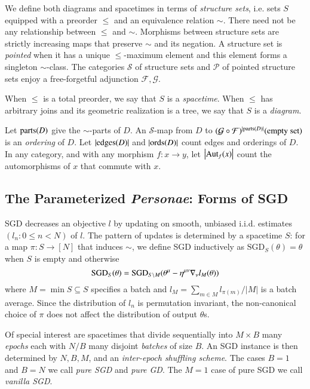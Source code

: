 \documentclass{article}
\theoremstyle{plain}
\theoremstyle{definition}
\newcommand{\wabs}[1]{\left|#1\right|}
\newcommand{\Free}{\mathcal{F}}
\newcommand{\Forg}{\mathcal{G}}
\newcommand{\Aut}{\text{\textnormal{Aut}}}
\newcommand{\edges}{\text{\textnormal{edges}}}
\newcommand{\ords}{\text{\textnormal{ords}}}
\newcommand{\parts}{\text{\textnormal{parts}}}
\newcommand{\SGD}{\text{\textnormal{SGD}}}
\newcommand{\Pp}{\mathcal{P}}
\newcommand{\Ss}{\mathcal{S}}
\begin{document}
        We define both diagrams and spacetimes in terms of \emph{structure
        sets}, i.e. sets $S$ equipped with a preorder $\leq$ and an equivalence
        relation $\sim$.  There need not be any relationship between $\leq$ and
        $\sim$.  Morphisms between structure sets are strictly increasing maps
        that preserve $\sim$ and its negation.  A structure set is
        \emph{pointed} when it has a unique $\leq$-maximum element and this
        element forms a singleton $\sim$-class.  The categories $\Ss$ of
        structure sets and $\Pp$ of pointed structure sets enjoy a
        free-forgetful adjunction $\Free, \Forg$.
        
        When $\leq$ is a total preorder, we say that $S$ is a \emph{spacetime}.
        When $\leq$ has arbitrary joins and its geometric realization is a
        tree, we say that $S$ is a \emph{diagram}. 
        
        Let $\parts(D)$ give the $\sim$-parts of $D$.  An $\Ss$-map from $D$ to
        $
            (\Forg\circ\Free)^{|\parts(D)|}(\text{empty set})
        $
        is an \emph{ordering} of $D$.  Let $|\edges(D)|$ and $|\ords(D)|$ count
        edges and orderings of $D$.  In any category, and with any morphism
        $f: x\to y$, let $\wabs{\Aut_f(x)}$ count the automorphisms of $x$
        that commute with $x$.
    
    \subsection{The Parameterized \emph{Personae}: Forms of SGD}
        SGD decreases an objective $l$ by updating on smooth, unbiased i.i.d.
        estimates $(l_n: 0\leq n<N)$ of $l$.  The pattern of updates is
        determined by a spacetime $S$: for a map
        $\pi:S\to [N]$ that induces $\sim$, we define SGD inductively as
        $\text{SGD}_{S}(\theta) = \theta$ when $S$ is empty and otherwise
        $$
            \SGD_S(\theta)
            =
            \SGD_{S\setminus M}(
                \theta^\mu - \eta^{\mu\nu} \nabla_\nu l_{M}(\theta)
            )
        $$
        where $M = \min S \subseteq S$ specifies a batch and $l_M = \sum_{m\in
        M} l_{\pi(m)} / \wabs{M}$ is a batch average.  Since the distribution
        of $l_n$ is permutation invariant, the non-canonical choice of $\pi$
        does not affect the distribution of output $\theta$s.
    
        Of special interest are spacetimes that divide sequentially into
        $M\times B$ many \emph{epochs} each with $N/B$ many disjoint
        \emph{batches} of size $B$.  An SGD instance is then determined by $N,
        B, M$, and an \emph{inter-epoch shuffling scheme}.  The cases $B=1$ and
        $B=N$ we call \emph{pure SGD} and \emph{pure GD}.  The $M=1$ case of
        pure SGD we call \emph{vanilla SGD}.
\end{document}
